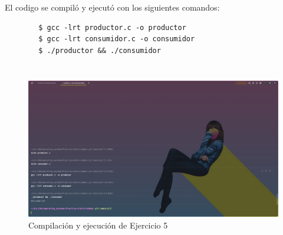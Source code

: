 \documentclass{article}
\newenvironment{code}{\captionsetup{type=listing}}{}
\begin{document}
	El codigo se compiló y ejecutó con los siguientes comandos:
	\begin{verbatim}
		$ gcc -lrt productor.c -o productor
		$ gcc -lrt consumidor.c -o consumidor
		$ ./productor && ./consumidor
	\end{verbatim}

	\begin{code}
		\inputminted{c}{../Ejercicios/producer.c}
	\end{code}
	\begin{code}
		\inputminted{c}{../Ejercicios/consumer.c}
	\end{code}

	\begin{figure}[h]
		\caption{Compilación y ejecución de Ejercicio 5}
		\centering
		\includegraphics[scale=0.3,trim={0 0 20cm 26cm},clip]{ejer-e5.png}
	\end{figure}

\newpage
\end{document}
